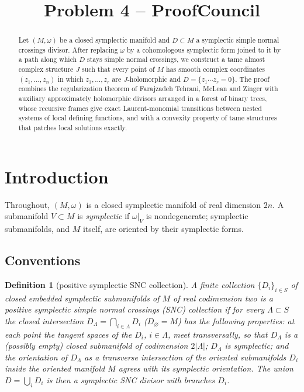 \documentclass[12pt]{article}
\title{Problem 4 -- ProofCouncil}
\author{}
\date{}
\newtheorem{definition}[theorem]{Definition}
\theoremstyle{remark}
\begin{document}
\maketitle

\begin{abstract}
Let $(M,\omega)$ be a closed symplectic manifold and $D\subset M$ a
symplectic simple normal crossings divisor. After replacing $\omega$ by
a cohomologous symplectic form joined to it by a path along which $D$
stays simple normal crossings, we construct a tame almost complex
structure $J$ such that every point of $M$ has smooth complex
coordinates $(z_1,\dots,z_n)$ in which $z_1,\dots,z_r$ are
$J$-holomorphic and $D=\{z_1\cdots z_r=0\}$. The proof combines the
regularization theorem of Farajzadeh Tehrani, McLean and Zinger with
auxiliary approximately holomorphic divisors arranged in a forest of
binary trees, whose recursive frames give exact Laurent-monomial
transitions between nested systems of local defining functions, and
with a convexity property of tame structures that patches local
solutions exactly.
\end{abstract}

\section{Introduction}

Throughout, $(M,\omega)$ is a closed symplectic manifold of real
dimension $2n$. A submanifold $V\subset M$ is \emph{symplectic} if
$\omega|_V$ is nondegenerate; symplectic submanifolds, and $M$ itself,
are oriented by their symplectic forms.

\subsection*{Conventions}

\begin{definition}[positive symplectic SNC collection]\label{def:snc}
A finite collection $\{D_i\}_{i\in S}$ of closed embedded symplectic
submanifolds of $M$ of real codimension two is a \emph{positive
symplectic simple normal crossings (SNC) collection} if for every
$\Lambda\subset S$ the \emph{closed intersection}
$D_\Lambda=\bigcap_{i\in\Lambda}D_i$ ($D_\varnothing=M$) has the
following properties: at each point the tangent spaces of the $D_i$,
$i\in\Lambda$, meet transversally, so that $D_\Lambda$ is a (possibly
empty) closed submanifold of codimension $2|\Lambda|$; $D_\Lambda$ is
symplectic; and the orientation of $D_\Lambda$ as a transverse
intersection of the oriented
submanifolds $D_i$ inside the oriented manifold $M$ agrees with its
symplectic orientation. The union $D=\bigcup_iD_i$ is then a
\emph{symplectic SNC divisor} with \emph{branches} $D_i$.
\end{definition}
\end{document}
